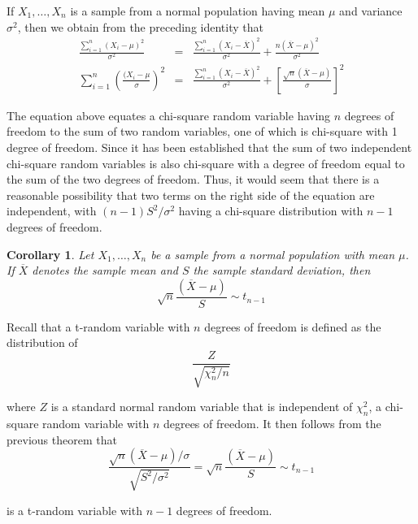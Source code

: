 \documentclass[12pt]{article}
\newtheorem{corollary}[theorem]{Corollary}
\begin{document}
If $X_1, \dots, X_n$ is a sample from a normal population having mean $\mu$ and variance $\sigma^2$, then we obtain from the preceding identity that
\begin{eqnarray*}
  \frac{\sum_{i=1}^n (X_i - \mu)^2}{\sigma^2}
  &=& \frac{\sum_{i=1}^n (X_i - \overline{X})^2}{\sigma^2}
  + \frac{n (\overline{X} - \mu)^2}{\sigma^2} \\
  \sum_{i=1}^n \left( \frac{ (X_i - \mu}{\sigma} \right)^2
  &=& \frac{\sum_{i=1}^n (X_i - \overline{X})^2}{\sigma^2}
  + \left[ \frac{\sqrt{n} (\overline{X} - \mu)}{\sigma} \right]^2
\end{eqnarray*}

The equation above equates a chi-square random variable having $n$ degrees of freedom to the sum of two random variables, one of which is chi-square with 1 degree of freedom. Since it has been established that the sum of two independent chi-square random variables is also chi-square with a degree of freedom equal to the sum of the two degrees of freedom. Thus, it would seem that there is a reasonable possibility that two terms on the right side of the equation are independent, with $(n-1)S^2 / \sigma^2$ having a chi-square distribution with $n-1$ degrees of freedom.

\begin{corollary}
  Let $X_1, \dots, X_n$ be a sample from a normal population with mean $\mu$. If $\overline{X}$ denotes the sample mean and $S$ the sample standard deviation, then
  \begin{equation*}
    \sqrt{n} \frac{(\overline{X} - \mu)}{S} \sim t_{n-1}
  \end{equation*}
\end{corollary}

Recall that a t-random variable with $n$ degrees of freedom is defined as the distribution of
\begin{equation*}
  \frac{Z}{\sqrt{\chi_n^2 / n}}
\end{equation*}

where $Z$ is a standard normal random variable that is independent of $\chi_n^2$, a chi-square random variable with $n$ degrees of freedom. It then follows from the previous theorem that
\begin{equation*}
  \frac{\sqrt{n} (\overline{X} - \mu) / \sigma}{\sqrt{S^2 / \sigma^2}}
  = \sqrt{n} \frac{(\overline{X} - \mu)}{S} \sim t_{n-1}
\end{equation*}

is a t-random variable with $n-1$ degrees of freedom.
\end{document}
